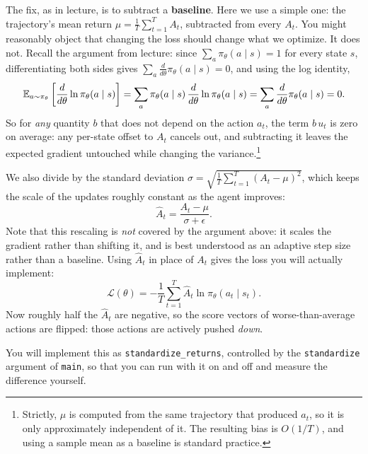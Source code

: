 The fix, as in lecture, is to subtract a \textbf{baseline}. Here we use a simple
one: the trajectory's mean return $\mu = \frac{1}{T}\sum_{t=1}^{T} A_t$,
subtracted from every $A_t$. You might reasonably object that changing the loss
should change what we optimize. It does not. Recall the argument from lecture:
since $\sum_a \pi_\theta(a \mid s) = 1$ for every state $s$, differentiating both
sides gives $\sum_a \frac{d}{d\theta} \pi_\theta(a \mid s) = 0$, and using the
log identity,
\begin{equation}
    \mathbb{E}_{a \sim \pi_\theta}\left[ \frac{d}{d\theta} \ln \pi_\theta(a \mid s) \right]
    = \sum_a \pi_\theta(a \mid s) \, \frac{d}{d\theta} \ln \pi_\theta(a \mid s)
    = \sum_a \frac{d}{d\theta} \pi_\theta(a \mid s) = 0.
\end{equation}
So for \emph{any} quantity $b$ that does not depend on the action $a_t$, the term
$b \, u_t$ is zero on average: any per-state offset to $A_t$ cancels out, and
subtracting it leaves the expected gradient untouched while changing the
variance.\footnote{Strictly, $\mu$ is computed from the same trajectory that
produced $a_t$, so it is only approximately independent of it. The resulting
bias is $O(1/T)$, and using a sample mean as a baseline is standard practice.}

We also divide by the standard deviation
$\sigma = \sqrt{\frac{1}{T}\sum_{t=1}^{T} (A_t - \mu)^2}$, which keeps the scale of
the updates roughly constant as the agent improves:
\begin{equation}
    \label{eq:standardize}
    \hat{A}_t = \frac{A_t - \mu}{\sigma + \epsilon}.
\end{equation}
Note that this rescaling is \emph{not} covered by the argument above: it scales
the gradient rather than shifting it, and is best understood as an adaptive step
size rather than a baseline. Using $\hat{A}_t$ in place of $A_t$ gives the loss
you will actually implement:
\begin{equation}
    \label{eq:loss-standardized}
    \mathcal{L}(\theta) = -\frac{1}{T}\sum_{t=1}^{T} \hat{A}_t \ln \pi_\theta(a_t \mid s_t).
\end{equation}
Now roughly half the $\hat{A}_t$ are negative, so the score vectors of
worse-than-average actions are flipped: those actions are actively pushed
\emph{down}.

You will implement this as \texttt{standardize\_returns}, controlled by the
\texttt{standardize} argument of \texttt{main}, so that you can run with it on
and off and measure the difference yourself.

